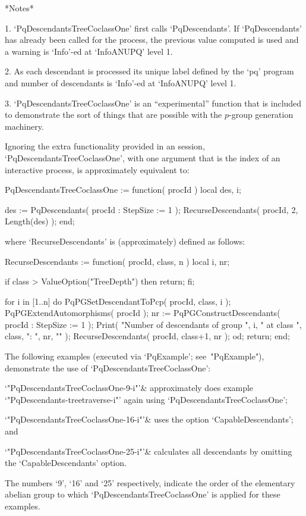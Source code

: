 *Notes*

\beginlist%

\item{1.}
`PqDescendantsTreeCoclassOne'    first    calls    `PqDescendants'.    If
`PqDescendants' has already been called for  the  process,  the  previous
value computed is used and a warning is `Info'-ed at `InfoANUPQ' level 1.

\item{2.}
As each descendant is processed its unique  label  defined  by  the  `pq'
program and number of descendants is `Info'-ed at `InfoANUPQ' level 1.

\item{3.}
`PqDescendantsTreeCoclassOne' is an  ``experimental''  function  that  is
included to demonstrate the sort of things that  are  possible  with  the
$p$-group generation machinery.

\endlist

Ignoring  the  extra  functionality  provided  in  an  {\XGAP}   session,
`PqDescendantsTreeCoclassOne', with one argument that is the index of  an
interactive {\ANUPQ} process, is approximately equivalent to:

\begintt
PqDescendantsTreeCoclassOne := function( procId )
    local   des,  i;

    des := PqDescendants( procId : StepSize := 1 );
    RecurseDescendants( procId, 2, Length(des) );
end;
\endtt

where `RecurseDescendants' is (approximately) defined as follows:

\begintt
RecurseDescendants := function( procId, class, n )
    local   i,  nr;

    if class > ValueOption("TreeDepth") then return; fi;

    for i in [1..n] do
        PqPGSetDescendantToPcp( procId, class, i );
        PqPGExtendAutomorphisms( procId );
        nr := PqPGConstructDescendants( procId : StepSize := 1 );
        Print( "Number of descendants of group ", i,
               " at class ", class, ": ", nr, "\n" );
        RecurseDescendants( procId, class+1, nr );
    od;
    return;
end;
\endtt

The  following  examples  (executed  via  `PqExample';  see~"PqExample"),
demonstrate the use of `PqDescendantsTreeCoclassOne':

\beginitems

`"PqDescendantsTreeCoclassOne-9-i"'&
approximately does example `"PqDescendants-treetraverse-i"' again  using
`PqDescendantsTreeCoclassOne';

`"PqDescendantsTreeCoclassOne-16-i"'&
uses the option `CapableDescendants'; and

`"PqDescendantsTreeCoclassOne-25-i"'&
calculates all descendants by omitting the `CapableDescendants' option.

\enditems

The numbers `9', `16' and `25' respectively, indicate the  order  of  the
elementary  abelian  group  to  which  `PqDescendantsTreeCoclassOne'   is
applied for these examples.

